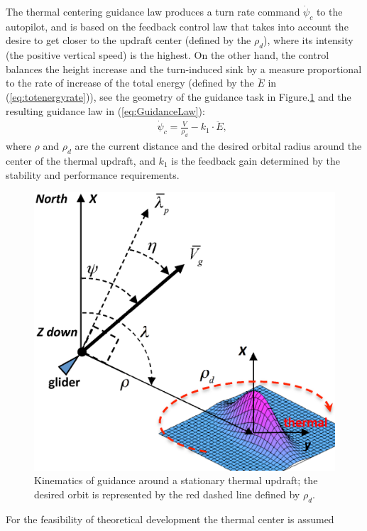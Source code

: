 \documentclass{ifacconf}
\begin{document}
The thermal centering guidance law produces a turn rate command
$\dot{\psi}_{c}$ to the autopilot, and is based on the feedback control law
that takes into account the desire to get closer to the updraft center
(defined by the $\rho_d$), where its intensity (the positive vertical speed)
is the highest. On the other hand, the control balances the height increase
and the turn-induced sink by a measure proportional to the rate of increase
of the total energy (defined by the $\ddot{E}$ in (\ref{eq:totenergyrate})),
see the geometry of the guidance task in Figure.\ref{fig:ThermaG} and the
resulting guidance law in (\ref{eq:GuidanceLaw}):
\begin{eqnarray}
    && \dot{\psi}_{c}=\frac{V}{\rho_d}-k_1 \cdot \ddot{E},
    \label{eq:GuidanceLaw}
\end{eqnarray}
where $\rho$ and $\rho_d$ are the current distance and the desired orbital
radius around the center of the thermal updraft, and $k_1$ is the feedback
gain determined by the stability and performance requirements.
\begin{figure}[thpb]
  \centering
  \includegraphics[scale=0.3]{Figures/ThermalG.eps}
  \caption{Kinematics of guidance around a stationary thermal updraft;
  the desired orbit is represented by the red dashed line defined by $\rho_d$.}
  \label{fig:ThermaG}
\end{figure}
For the feasibility of theoretical development the thermal center is assumed
\end{document}
